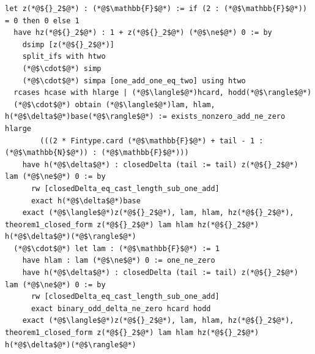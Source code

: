 \begin{lstlisting}[style=leancode]
  let z(*@${}_2$@*) : (*@$\mathbb{F}$@*) := if (2 : (*@$\mathbb{F}$@*)) = 0 then 0 else 1
  have hz(*@${}_2$@*) : 1 + z(*@${}_2$@*) (*@$\ne$@*) 0 := by
    dsimp [z(*@${}_2$@*)]
    split_ifs with htwo
    (*@$\cdot$@*) simp
    (*@$\cdot$@*) simpa [one_add_one_eq_two] using htwo
  rcases hcase with hlarge | (*@$\langle$@*)hcard, hodd(*@$\rangle$@*)
  (*@$\cdot$@*) obtain (*@$\langle$@*)lam, hlam, h(*@$\delta$@*)base(*@$\rangle$@*) := exists_nonzero_add_ne_zero hlarge
        (((2 * Fintype.card (*@$\mathbb{F}$@*) + tail - 1 : (*@$\mathbb{N}$@*)) : (*@$\mathbb{F}$@*)))
    have h(*@$\delta$@*) : closedDelta (tail := tail) z(*@${}_2$@*) lam (*@$\ne$@*) 0 := by
      rw [closedDelta_eq_cast_length_sub_one_add]
      exact h(*@$\delta$@*)base
    exact (*@$\langle$@*)z(*@${}_2$@*), lam, hlam, hz(*@${}_2$@*), theorem1_closed_form z(*@${}_2$@*) lam hlam hz(*@${}_2$@*) h(*@$\delta$@*)(*@$\rangle$@*)
  (*@$\cdot$@*) let lam : (*@$\mathbb{F}$@*) := 1
    have hlam : lam (*@$\ne$@*) 0 := one_ne_zero
    have h(*@$\delta$@*) : closedDelta (tail := tail) z(*@${}_2$@*) lam (*@$\ne$@*) 0 := by
      rw [closedDelta_eq_cast_length_sub_one_add]
      exact binary_odd_delta_ne_zero hcard hodd
    exact (*@$\langle$@*)z(*@${}_2$@*), lam, hlam, hz(*@${}_2$@*), theorem1_closed_form z(*@${}_2$@*) lam hlam hz(*@${}_2$@*) h(*@$\delta$@*)(*@$\rangle$@*)
\end{lstlisting}

